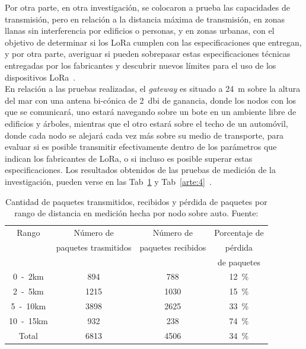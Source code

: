 \begin{justify}
Por otra parte, en otra investigación, se colocaron a prueba las capacidades de transmisión, pero en relación a la distancia máxima de transmisión, en zonas llanas sin interferencia por edificios o personas, y en zonas urbanas, con el objetivo de determinar si los LoRa cumplen con las especificaciones que entregan, y por otra parte, averiguar si pueden sobrepasar estas especificaciones técnicas entregadas por los fabricantes y descubrir nuevos límites para el uso de los dispositivos LoRa~\cite{Juha}.\\
En relación a las pruebas realizadas, el \textit{gateway} es situado a \SI{24}{\meter} sobre la altura del mar con una antena bi-cónica de \SI{2}{dbi} de ganancia, donde los nodos con los que se comunicará, uno estará navegando sobre un bote en un ambiente libre de edificios y árboles, mientras que el otro estará sobre el techo de un automóvil, donde cada nodo se alejará cada vez más sobre su medio de transporte, para evaluar si es posible transmitir efectivamente dentro de los parámetros que indican los fabricantes de LoRa, o si incluso es posible superar estas especificaciones. Los resultados obtenidos de las pruebas de medición de la investigación, pueden verse en las Tab~\ref{arte:3} y Tab~\ref{arte:4}~\cite{Juha}.\\
\begin{table}[!ht]
\centering
\begin{tabular}{|c|c|c|c|}
\hline
Rango & Número de            & Número de          & Porcentaje de  \\
      & paquetes trasmitidos & paquetes recibidos &  pérdida\\ 
      &                      &                    &   de paquetes \\ \hline
\si{0-2}{km} & \num{894} & \num{788} & \SI{12}{\percent} \\ \hline
\si{2-5}{km} & \num{1215} & \num{1030} & \SI{15}{\percent} \\ \hline
\si{5-10}{km} & \num{3898} & \num{2625} & \SI{33}{\percent} \\ \hline
\si{10-15}{km} & \num{932} & \num{238} & \SI{74}{\percent} \\ \hline
Total & \num{6813} & \num{4506} & \SI{34}{\percent} \\ \hline
\end{tabular}
\caption{Cantidad de paquetes transmitidos, recibidos y pérdida de paquetes por rango de distancia en medición hecha por nodo sobre auto. Fuente:\cite{Juha}}
\label{arte:3}
\end{table}


\end{justify}

